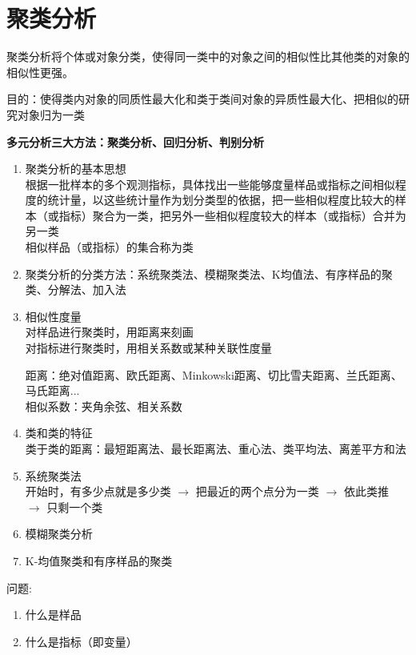 \documentclass[UTF8,10pt]{book}
\begin{document}
{\section{聚类分析}\label{header-n32}

聚类分析将个体或对象分类，使得同一类中的对象之间的相似性比其他类的对象的相似性更强。

目的：使得类内对象的同质性最大化和类于类间对象的异质性最大化、把相似的研究对象归为一类

\textbf{多元分析三大方法：聚类分析、回归分析、判别分析}

\begin{enumerate}
	\def\labelenumi{\arabic{enumi}.}
	\item
	聚类分析的基本思想\\
	根据一批样本的多个观测指标，具体找出一些能够度量样品或指标之间相似程度的统计量，以这些统计量作为划分类型的依据，把一些相似程度比较大的样本（或指标）聚合为一类，把另外一些相似程度较大的样本（或指标）合并为另一类\\
	相似样品（或指标）的集合称为类
	\item
	聚类分析的分类方法：系统聚类法、模糊聚类法、K均值法、有序样品的聚类、分解法、加入法
	\item
	相似性度量\\
	对样品进行聚类时，用距离来刻画\\
	对指标进行聚类时，用相关系数或某种关联性度量
	
	距离：绝对值距离、欧氏距离、Minkowski距离、切比雪夫距离、兰氏距离、马氏距离...\\
	相似系数：夹角余弦、相关系数
	\item
	类和类的特征\\
	类于类的距离：最短距离法、最长距离法、重心法、类平均法、离差平方和法
	\item
	系统聚类法\\
	开始时，有多少点就是多少类 \(\rightarrow\) 把最近的两个点分为一类
	\(\rightarrow\) 依此类推 \(\rightarrow\) 只剩一个类
	\item
	模糊聚类分析
	\item
	K-均值聚类和有序样品的聚类
\end{enumerate}

问题:

\begin{enumerate}
	\def\labelenumi{\arabic{enumi}.}
	\item
	什么是样品
	\item
	什么是指标（即变量）
\end{enumerate}

}
\end{document}
